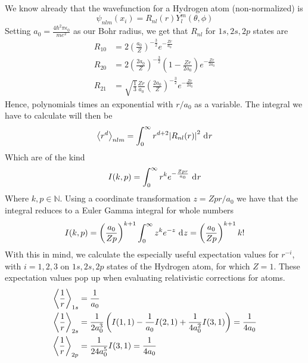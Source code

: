 \documentclass[../qm.tex]{subfiles}
\begin{document}
	We know already that the wavefunction for a Hydrogen atom (non-normalized) is
	\begin{equation}
		\psi_{nlm}(x_i)=R_{nl}(r)Y^m_l(\theta,\phi)
		\label{eq:hydrogenwavefunctionappendix}
	\end{equation}
	Setting $a_0=\frac{4\hbar^2\pi\epsilon_0}{me^2}$ as our Bohr radius, we get that $R_{nl}$ for $1s,2s,2p$ states are
	\begin{equation}
		\begin{aligned}
			R_{10}&=2\left( \frac{a_0}{Z} \right)^{-\frac{3}{2}}e^{-\frac{Zr}{a_0}}\\
			R_{20}&=2\left( \frac{2a_0}{Z} \right)^{-\frac{3}{2}}\left( 1-\frac{Zr}{2a_0} \right)e^{-\frac{Zr}{2a_0}}\\
			R_{21}&=\sqrt{\frac{1}{3}}\frac{Zr}{a_0}\left( \frac{2a_0}{Z} \right)^{-\frac{3}{2}}e^{-\frac{Zr}{2a_0}}
		\end{aligned}
		\label{eq:rnlappendix}
	\end{equation}
	Hence, polynomials times an exponential with $r/a_0$ as a variable. The integral we have to calculate will then be
	\begin{equation}
		\expval{r^d}_{nlm}=\int_{0}^{\infty}r^{d+2}\abs{R_{nl}(r)}^2\ \mathrm{d}^{}r
		\label{eq:completeintegralrdapp}
	\end{equation}
	Which are of the kind
	\begin{equation}
		I(k,p)=\int_{0}^{\infty}r^ke^{-\frac{Zpr}{a_0}}\ \mathrm{d}^{}r
		\label{eq:integralstocalculate}
	\end{equation}
	Where $k,p\in\mathbb{N}$. Using a coordinate transformation $z=Zpr/a_0$ we have that the integral reduces to a Euler Gamma integral for whole numbers
	\begin{equation}
		I(k,p)=\left( \frac{a_0}{Zp} \right)^{k+1}\int_{0}^{\infty}z^ke^{-z}\ \mathrm{d}^{}z=\left( \frac{a_0}{Zp} \right)^{k+1}k!
		\label{eq:integralssolved}
	\end{equation}
	With this in mind, we calculate the especially useful expectation values for $r^{-i}$, with $i=1,2,3$ on $1s,2s,2p$ states of the Hydrogen atom, for which $Z=1$. These expectation values pop up when evaluating relativistic corrections for atoms.
	\begin{equation}
		\begin{aligned}
			\expval{\frac{1}{r}}_{1s}&=\frac{1}{a_0}\\
			\expval{\frac{1}{r}}_{2s}&=\frac{1}{2a_0^3}\left( I(1,1)-\frac{1}{a_0}I(2,1)+\frac{1}{4a_0^2}I(3,1) \right)=\frac{1}{4a_0}\\
			\expval{\frac{1}{r}}_{2p}&=\frac{1}{24a_0^5}I(3,1)=\frac{1}{4a_0}
		\end{aligned}
		\label{eq:rminusoneapp}
	\end{equation}
\end{document}
